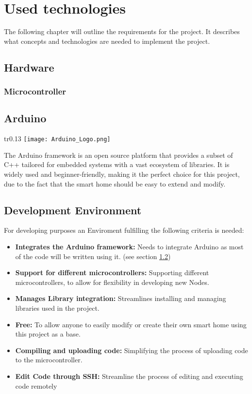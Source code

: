 \chapter{Used technologies} 
The following chapter will outline the requirements for the 
project. It describes what concepts and technologies are needed
to implement the project.
    \section{Hardware}
        \subsection{Microcontroller}
        
    \section{Arduino}\label{sec:arduino}
    \begin{wrapfigure}[2]{tr}{0.13\textwidth} %
        \vspace{-1.4cm}
        \hspace{3cm}
        \texttt{[image: Arduino\_Logo.png]}
    \end{wrapfigure}
    The Arduino framework is an open source platform that
    provides a subset of C++ tailored for embedded systems
    with a vast ecosystem of libraries. It is widely used
    and beginner-friendly, making it the perfect choice for
    this project, due to the fact that the smart home 
    should be easy to extend and modify.

    \section{Development Environment}
    For developing purposes an Enviroment fulfilling the following criteria is needed:
    \begin{itemize}[itemsep=0em]
        \item \textbf{Integrates the Arduino framework:}
        Needs to integrate Arduino as most of the code will be written using it. 
        (see section \ref{sec:arduino})
        \item \textbf{Support for different microcontrollers:}
        Supporting different microcontrollers, to allow for flexibility
        in developing new Nodes.
        \item \textbf{Manages Library integration:}
        Streamlines installing and managing libraries used in the project.
        \item \textbf{Free:}
        To allow anyone to easily modify  or create their own smart home
        using this project as a base.
        \item \textbf{Compiling and uploading code:} 
        Simplifying the process of uploading code to the microcontroller.
        \item \textbf{Edit Code through SSH:}
        Streamline the process of editing and executing code remotely
    \end{itemize} 
        \vspace{1cm}
